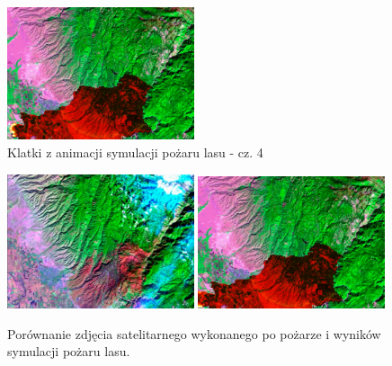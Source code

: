 \documentclass{article}
\begin{document}
\begin{figure}
        \includegraphics[width=0.49\textwidth]{resources/wildfire.overlay.251.png}
        \caption{Klatki z animacji symulacji pożaru lasu - cz. 4}
        \label{frames-4}
    \end{figure}

    \begin{figure}
        \centering
        \includegraphics[width=0.49\textwidth]{resources/forest_map_burn.png}\hfill
        \includegraphics[width=0.49\textwidth]{resources/wildfire.overlay.266.png}
        \caption{Porównanie zdjęcia satelitarnego wykonanego po pożarze i wyników symulacji pożaru lasu.}
        \label{comparison}
    \end{figure}

\newpage
 
\printbibliography
\end{document}
